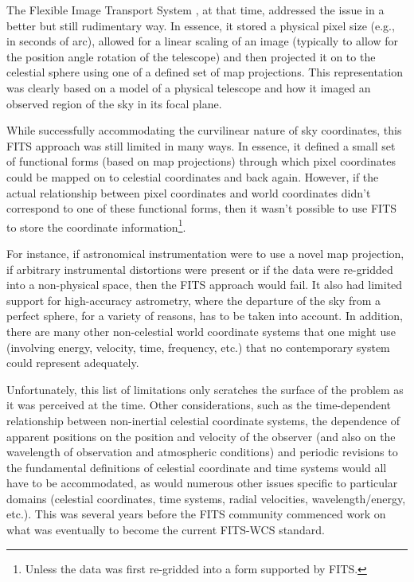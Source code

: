\documentclass[final,authoryear,5p,times,twocolumn]{elsarticle}
\begin{document}
The Flexible Image Transport System
\citep[FITS;][]{1981A&AS...44..363W,1995ASPC...77..233G}, at that
time, addressed the issue in a better but still rudimentary way. In
essence, it stored a physical pixel size (e.g., in seconds of arc),
allowed for a linear scaling of an image (typically to allow for the
position angle rotation of the telescope) and then projected it on to
the celestial sphere using one of a defined set of map
projections. This representation was clearly based on a model of a
physical telescope and how it imaged an observed region of the sky in
its focal plane.

While successfully accommodating the curvilinear nature of sky
coordinates, this FITS approach was still limited in many ways. In
essence, it defined a small set of functional forms (based on map
projections) through which pixel coordinates could be mapped on to
celestial coordinates and back again. However, if the actual
relationship between pixel coordinates and world coordinates didn't
correspond to one of these functional forms, then it wasn't possible
to use FITS to store the coordinate information\footnote{Unless the data was
first re-gridded into a form supported by FITS.}.

For instance, if astronomical instrumentation were to use a novel map
projection, if arbitrary instrumental distortions were present or if
the data were re-gridded into a non-physical space, then the FITS
approach would fail. It also had limited support for high-accuracy
astrometry, where the departure of the sky from a perfect sphere, for
a variety of reasons, has to be taken into account. In addition, there
are many other non-celestial world coordinate systems that one might
use (involving energy, velocity, time, frequency, etc.) that no
contemporary system could represent adequately.

Unfortunately, this list of limitations only scratches the surface of
the problem as it was perceived at the time. Other considerations,
such as the time-dependent relationship between non-inertial celestial
coordinate systems, the dependence of apparent positions on the
position and velocity of the observer (and also on the wavelength of
observation and atmospheric conditions) and periodic revisions to the
fundamental definitions of celestial coordinate and time systems would
all have to be accommodated, as would numerous other issues specific
to particular domains (celestial coordinates, time systems, radial
velocities, wavelength/energy, etc.). This was several years before the 
FITS community commenced work on what was eventually to become the current 
FITS-WCS standard.
\end{document}
